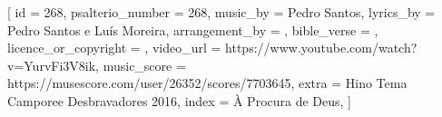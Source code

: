 
[
    id                     = {268},
    psalterio_number       = {268},
    music_by               = {Pedro Santos},
    lyrics_by              = {Pedro Santos e Luís Moreira},
    arrangement_by         = {},
    bible_verse            = {},
    licence_or_copyright   = {},
    video_url              = {https://www.youtube.com/watch?v=YurvFi3V8ik},
    music_score            = {https://musescore.com/user/26352/scores/7703645}, 
    extra                  = {Hino Tema Camporee Desbravadores 2016},
    index                  = {À Procura de Deus},
]


